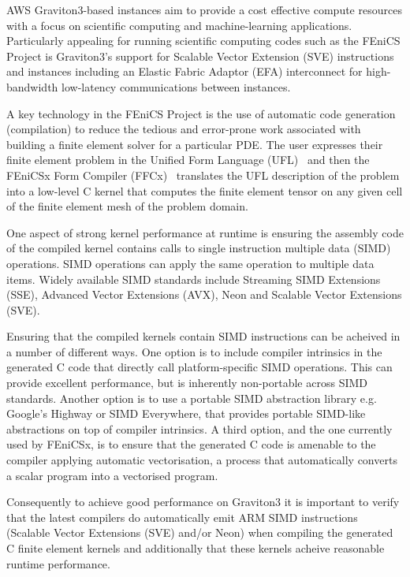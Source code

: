 AWS Graviton3-based instances aim to provide a cost effective compute resources
with a focus on scientific computing and machine-learning applications.
Particularly appealing for running scientific computing codes such as the
FEniCS Project is Graviton3's support for Scalable Vector Extension (SVE)
instructions and instances including an Elastic Fabric Adaptor (EFA)
interconnect for high-bandwidth low-latency communications between instances.

A key technology in the FEniCS Project is the use of automatic code generation
(compilation) to reduce the tedious and error-prone work associated with
building a finite element solver for a particular PDE. The user expresses their
finite element problem in the Unified Form Language
(UFL)~\citep{alnaes_unified_2014} and then the FEniCSx Form Compiler
(FFCx)~\citep{kirby_compiler_2006} translates the UFL description of the problem
into a low-level C kernel that computes the finite element tensor on any given
cell of the finite element mesh of the problem domain.

One  aspect of strong kernel performance at runtime is ensuring the assembly
code of the compiled kernel contains calls to single instruction multiple data
(SIMD) operations. SIMD operations can apply the same operation to multiple
data items. Widely available SIMD standards include Streaming SIMD Extensions
(SSE), Advanced Vector Extensions (AVX), Neon and Scalable Vector Extensions
(SVE). 

Ensuring that the compiled kernels contain SIMD instructions can be acheived in
a number of different ways. One option is to include compiler intrinsics in the
generated C code that directly call platform-specific SIMD operations. This can
provide excellent performance, but is inherently non-portable across SIMD
standards. Another option is to use a portable SIMD abstraction library e.g.
Google's Highway or SIMD Everywhere, that provides portable SIMD-like
abstractions on top of compiler intrinsics. A third option, and the one
currently used by FEniCSx, is to ensure that the generated C code is amenable
to the compiler applying automatic vectorisation, a process that automatically
converts a scalar program into a vectorised program.
 
Consequently to achieve good performance on Graviton3 it is important to verify
that the latest compilers do automatically emit ARM SIMD instructions (Scalable
Vector Extensions (SVE) and/or Neon) when compiling the generated C finite
element kernels and additionally that these kernels acheive reasonable runtime
performance. 


